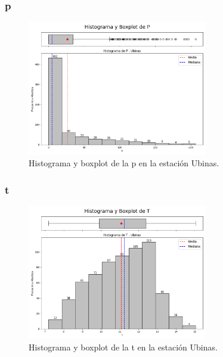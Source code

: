\subsubsection*{\gls{p} }
\begin{figure}[htbp]
\centering
\includegraphics[width=0.7\textwidth]{resultados/por_estacion_meteorologica/Ubinas/P_histograma.png}
\caption{Histograma y boxplot de la \gls{p}  en la estación Ubinas.}
\label{fig:ubinas_P}
\end{figure}

\subsubsection*{\gls{t} }
\begin{figure}[htbp]
\centering
\includegraphics[width=0.7\textwidth]{resultados/por_estacion_meteorologica/Ubinas/T_histograma.png}
\caption{Histograma y boxplot de la \gls{t}  en la estación Ubinas.}
\label{fig:ubinas_T}
\end{figure}


